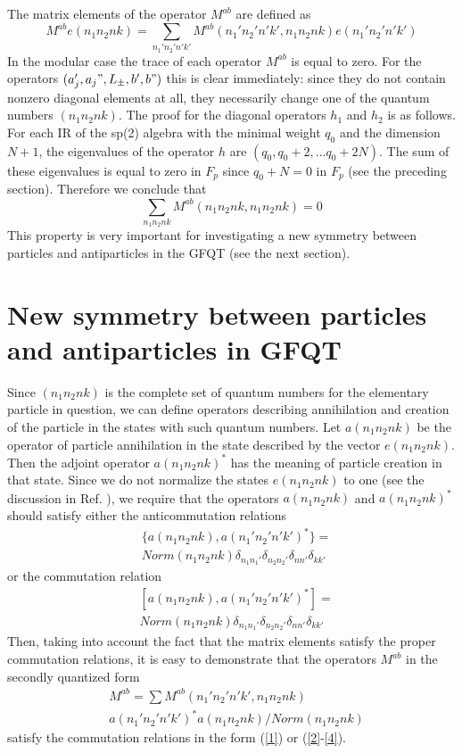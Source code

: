 \documentclass[a4paper,12pt]{article}%
\begin{document}
The matrix elements of the operator $M^{ab}$ are defined as
\begin{equation}
M^{ab}e(n_1n_2nk)=\sum_{n_1'n_2'n'k'}
M^{ab}(n_1'n_2'n'k',n_1n_2nk)e(n_1'n_2'n'k')
\label{28}
\end{equation}
In the modular case the trace of each operator $M^{ab}$ is
equal to zero. For the operators $(a_j',a_j",L_{\pm},b',b")$
this is clear immediately: since they do not contain
nonzero diagonal elements at all, they necessarily change
one of the quantum numbers $(n_1n_2nk)$. The proof for the
diagonal operators $h_1$ and $h_2$ is as follows. For each 
IR of the sp(2) algebra with the minimal weight $q_0$ and the 
dimension $N+1$, the eigenvalues of the operator $h$ are 
$(q_0,q_0+2,...q_0+2N)$. The sum of these eigenvalues is
equal to zero in $F_p$ since $q_0+N=0$ in $F_p$ (see the
preceding section). Therefore we conclude that
\begin{equation}
\sum_{n_1n_2nk} M^{ab}(n_1n_2nk,n_1n_2nk)=0
\label{29}
\end{equation} 
This property is very important for investigating a new
symmetry between particles and antiparticles in the GFQT
(see the next section).

\section{New symmetry between particles and antiparticles
in GFQT}
\label{S4}

Since $(n_1n_2nk)$ is the complete set of quantum numbers
for the elementary particle in question, we can define 
operators describing annihilation and creation of the 
particle in the
states with such quantum numbers. Let $a(n_1n_2nk)$ be the
operator of particle annihilation in the state described
by the vector $e(n_1n_2nk)$. Then the adjoint operator
$a(n_1n_2nk)^*$ has the meaning of particle creation in
that state. Since we do not normalize the states 
$e(n_1n_2nk)$ to one (see the discussion in Ref. 
\cite{lev2}), we require that the operators $a(n_1n_2nk)$ 
and $a(n_1n_2nk)^*$ should satisfy
either the anticommutation relations
\begin{eqnarray}
&\{a(n_1n_2nk),a(n_1'n_2'n'k')^*\}=\nonumber\\
&Norm(n_1n_2nk)
\delta_{n_1n_1'}\delta_{n_2n_2'}\delta_{nn'}\delta_{kk'}
\label{30}
\end{eqnarray}
or the commutation relation
\begin{eqnarray}
&[a(n_1n_2nk),a(n_1'n_2'n'k')^*]=\nonumber\\
&Norm(n_1n_2nk)
\delta_{n_1n_1'}\delta_{n_2n_2'}\delta_{nn'}\delta_{kk'}
\label{31}
\end{eqnarray}
Then, taking into account the fact that the matrix elements
satisfy the proper commutation relations, it is easy to 
demonstrate that
the operators $M^{ab}$ in the secondly quantized form
\begin{eqnarray}  
&M^{ab}=\sum M^{ab}(n_1'n_2'n'k',n_1n_2nk)\nonumber\\
&a(n_1'n_2'n'k')^*a(n_1n_2nk)/Norm(n_1n_2nk)
\label{32}
\end{eqnarray}
satisfy the commutation relations in the form (\ref{1}) or
(\ref{2}-\ref{4}).
\end{document}
